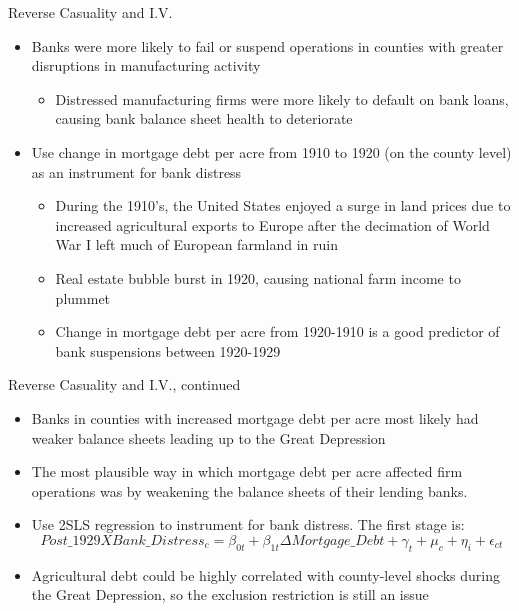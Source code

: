 \documentclass[11pt]{beamer}
\begin{document}
\begin{frame}{Reverse Casuality and I.V.}
\begin{itemize}
\item Banks were more likely to fail or suspend operations in counties with greater disruptions in manufacturing activity
\begin{itemize}
\item Distressed manufacturing firms were more likely to default on bank loans, causing bank balance sheet health to deteriorate
\end{itemize}
\item Use change in mortgage debt per acre from 1910 to 1920 (on the county level) as an instrument for bank distress
\begin{itemize}
\item During the 1910's, the United States enjoyed a surge in land prices due to increased agricultural exports to Europe after the decimation of World War I left much of European farmland in ruin
\item Real estate bubble burst in 1920, causing national farm income to plummet
\item Change in mortgage debt per acre from 1920-1910 is a good predictor of bank suspensions between 1920-1929
\end{itemize}
\end{itemize}
\end{frame}


\begin{frame}{Reverse Casuality and I.V., continued}
\begin{itemize}
\item Banks in counties with increased mortgage debt per acre most likely had weaker balance sheets leading up to the Great Depression
\item The most plausible way in which mortgage debt per acre affected firm operations was by weakening the balance sheets of their lending banks.
\item Use 2SLS regression to instrument for bank distress. The first stage is:
\[
Post\_1929XBank\_Distress_c = \beta_{0t} + \beta_{1t} \Delta Mortgage\_Debt + \gamma_t + \mu_c +\eta_i  + \epsilon_{ct}
\]
\item Agricultural debt could be highly correlated with county-level shocks during the Great Depression, so the exclusion restriction is still an issue
\end{itemize}
\end{frame}
\end{document}
